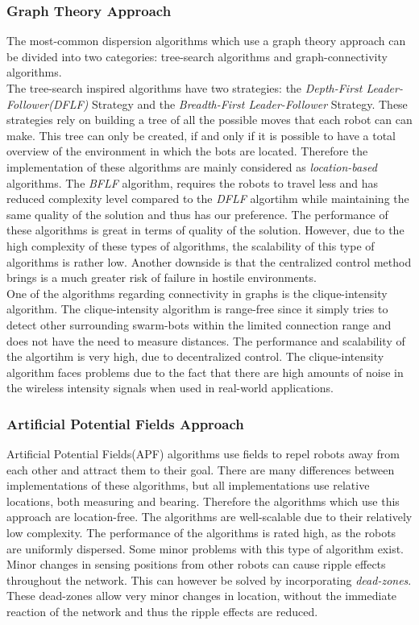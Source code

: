 \subsubsection{Graph Theory Approach}
The most-common dispersion algorithms which use a graph theory approach can be divided into two categories: tree-search algorithms and graph-connectivity algorithms.\\
The tree-search inspired algorithms have two strategies: the \emph{Depth-First Leader-Follower(DFLF)} Strategy and the \emph{Breadth-First Leader-Follower} Strategy.\cite{hsiang2004algorithms} These strategies rely on building a tree of all the possible moves that each robot can can make. 
This tree can only be created, if and only if it is possible to have a total overview of the environment in which the bots are located. Therefore the implementation of these algorithms are mainly considered as \emph{location-based} algorithms.
The \emph{BFLF} algorithm, requires the robots to travel less and has reduced complexity level compared to the \emph{DFLF} algortihm while maintaining the same quality of the solution and thus has our preference.
The performance of these algorithms is great in terms of quality of the solution.
However, due to the high complexity of these types of algorithms, the scalability of this type of algorithms is rather low.
Another downside is that the centralized control method brings is a much greater risk of failure in hostile environments.\\
One of the algorithms regarding connectivity in graphs is the clique-intensity algorithm.\cite{ugur2007dispersion}
The clique-intensity algorithm is range-free since it simply tries to detect other surrounding swarm-bots within the limited connection range and does not have the need to measure distances. The performance and scalability of the algortihm is very high, due to decentralized control.
The clique-intensity algorithm faces problems due to the fact that there are high amounts of noise in the wireless intensity signals when used in real-world applications. 

\subsubsection{Artificial Potential Fields Approach}
Artificial Potential Fields(APF) algorithms use fields to repel robots away from each other and attract them to their goal.\cite{khatib1986real}
There are many differences between implementations of these algorithms, but all implementations use relative locations, both measuring and bearing. Therefore the algorithms which use this approach are location-free.\cite{pakanati2010swarm}
The algorithms are well-scalable due to their relatively low complexity.
The performance of the algorithms is rated high, as the robots are uniformly dispersed.
Some minor problems with this type of algorithm exist.
Minor changes in sensing positions from other robots can cause ripple effects throughout the network.
This can however be solved by incorporating \emph{dead-zones}.
These dead-zones allow very minor changes in location, without the immediate reaction of the network and thus the ripple effects are reduced.\cite{pakanati2010swarm}


